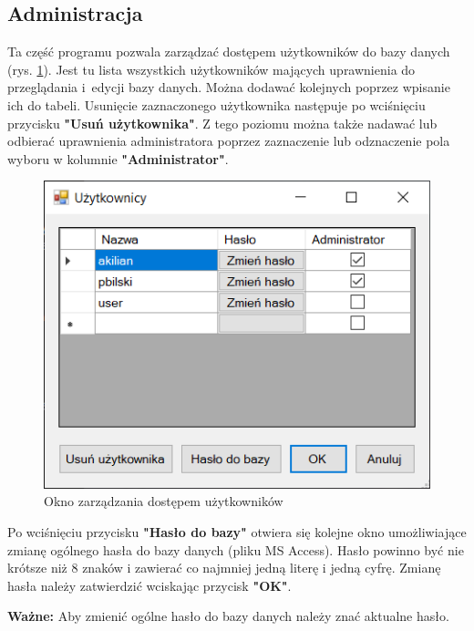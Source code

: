 \subsection{Administracja}
\label{admin}

Ta część programu pozwala zarządzać dostępem użytkowników do bazy danych (rys. \ref{administracja}). Jest tu lista wszystkich użytkowników mających uprawnienia do przeglądania i~edycji bazy danych. Można dodawać kolejnych poprzez wpisanie ich do tabeli. Usunięcie zaznaczonego użytkownika następuje po wciśnięciu przycisku \textbf{"Usuń użytkownika"}. Z tego poziomu można także nadawać lub odbierać uprawnienia administratora poprzez zaznaczenie lub odznaczenie pola wyboru w kolumnie \textbf{"Administrator"}.

\begin{figure}[htb]
	\centering
	\includegraphics{obrazki/Logowanie/administracja.png}
	\caption{Okno zarządzania dostępem użytkowników}
	\label{administracja}
\end{figure}

Po wciśnięciu przycisku \textbf{"Hasło do bazy"} otwiera się kolejne okno umożliwiające zmianę ogólnego hasła do bazy danych (pliku MS Access). Hasło powinno być nie krótsze niż 8 znaków i zawierać co najmniej jedną literę i jedną cyfrę. Zmianę hasła należy zatwierdzić wciskając przycisk \textbf{"OK"}.

\textbf{Ważne:} Aby zmienić ogólne hasło do bazy danych należy znać aktualne hasło.

